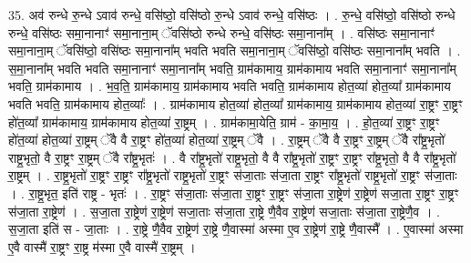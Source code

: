\documentclass[17pt]{extarticle}
\begin{document}
35. अव॑ रुन्धे रु॒न्धे ऽवाव॑ रुन्धे॒ वसि॑ष्ठो॒ वसि॑ष्ठो रु॒न्धे ऽवाव॑ रुन्धे॒ वसि॑ष्ठः । . रु॒न्धे॒ वसि॑ष्ठो॒ वसि॑ष्ठो रुन्धे रुन्धे॒ वसि॑ष्ठः समा॒नानाꣳ॑ समा॒नाना॒म् ॅवसि॑ष्ठो रुन्धे रुन्धे॒ वसि॑ष्ठः समा॒नाना᳚म् । . वसि॑ष्ठः समा॒नानाꣳ॑ समा॒नाना॒म् ॅवसि॑ष्ठो॒ वसि॑ष्ठः समा॒नाना᳚म् भवति भवति समा॒नाना॒म् ॅवसि॑ष्ठो॒ वसि॑ष्ठः समा॒नाना᳚म् भवति । . स॒मा॒नाना᳚म् भवति भवति समा॒नानाꣳ॑ समा॒नाना᳚म् भवति॒ ग्राम॑कामाय॒ ग्राम॑कामाय भवति समा॒नानाꣳ॑ समा॒नाना᳚म् भवति॒ ग्राम॑कामाय । . भ॒व॒ति॒ ग्राम॑कामाय॒ ग्राम॑कामाय भवति भवति॒ ग्राम॑कामाय होत॒व्या॑ होत॒व्या᳚ ग्राम॑कामाय भवति भवति॒ ग्राम॑कामाय होत॒व्याः᳚ । . ग्राम॑कामाय होत॒व्या॑ होत॒व्या᳚ ग्राम॑कामाय॒ ग्राम॑कामाय होत॒व्या॑ रा॒ष्ट्रꣳ रा॒ष्ट्रꣳ हो॑त॒व्या᳚ ग्राम॑कामाय॒ ग्राम॑कामाय होत॒व्या॑ रा॒ष्ट्रम् । . ग्राम॑कामा॒येति॒ ग्राम॑ - का॒मा॒य॒ । . हो॒त॒व्या॑ रा॒ष्ट्रꣳ रा॒ष्ट्रꣳ हो॑त॒व्या॑ होत॒व्या॑ रा॒ष्ट्रम् ॅवै वै रा॒ष्ट्रꣳ हो॑त॒व्या॑ होत॒व्या॑ रा॒ष्ट्रम् ॅवै । . रा॒ष्ट्रम् ॅवै वै रा॒ष्ट्रꣳ रा॒ष्ट्रम् ॅवै रा᳚ष्ट्र॒भृतो॑ राष्ट्र॒भृतो॒ वै रा॒ष्ट्रꣳ रा॒ष्ट्रम् ॅवै रा᳚ष्ट्र॒भृतः॑ । . वै रा᳚ष्ट्र॒भृतो॑ राष्ट्र॒भृतो॒ वै वै रा᳚ष्ट्र॒भृतो॑ रा॒ष्ट्रꣳ रा॒ष्ट्रꣳ रा᳚ष्ट्र॒भृतो॒ वै वै 
रा᳚ष्ट्र॒भृतो॑ रा॒ष्ट्रम् । . रा॒ष्ट्र॒भृतो॑ रा॒ष्ट्रꣳ रा॒ष्ट्रꣳ रा᳚ष्ट्र॒भृतो॑ राष्ट्र॒भृतो॑ रा॒ष्ट्रꣳ स॑जा॒ताः स॑जा॒ता रा॒ष्ट्रꣳ रा᳚ष्ट्र॒भृतो॑ राष्ट्र॒भृतो॑ रा॒ष्ट्रꣳ स॑जा॒ताः । . रा॒ष्ट्र॒भृत॒ इति॑ राष्ट्र - भृतः॑ । . रा॒ष्ट्रꣳ स॑जा॒ताः स॑जा॒ता रा॒ष्ट्रꣳ रा॒ष्ट्रꣳ स॑जा॒ता रा॒ष्ट्रेण॑ रा॒ष्ट्रेण॑ सजा॒ता रा॒ष्ट्रꣳ रा॒ष्ट्रꣳ स॑जा॒ता रा॒ष्ट्रेण॑ । . स॒जा॒ता रा॒ष्ट्रेण॑ रा॒ष्ट्रेण॑ सजा॒ताः स॑जा॒ता रा॒ष्ट्रे णै॒वैव रा॒ष्ट्रेण॑ सजा॒ताः स॑जा॒ता रा॒ष्ट्रेणै॒व । . स॒जा॒ता इति॑ स - जा॒ताः । . रा॒ष्ट्रे णै॒वैव रा॒ष्ट्रेण॑ रा॒ष्ट्रे णै॒वास्मा॑ अस्मा ए॒व रा॒ष्ट्रेण॑ रा॒ष्ट्रे णै॒वास्मै᳚ । . ए॒वास्मा॑ अस्मा ए॒वै वास्मै॑ रा॒ष्ट्रꣳ रा॒ष्ट्र म॑स्मा ए॒वै वास्मै॑ रा॒ष्ट्रम् । \newline
\end{document}

